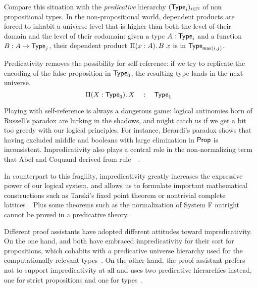 Compare this situation with the \emph{predicative} hierarchy 
$(\varType_i)_{i \in \Nat}$ 
% 
% 
of non propositional types.
In the non-propositional world, dependent products are forced to inhabit a 
universe level that is higher than both the level of their domain and the level
of their codomain:
% 
given a type \( A : \varType_i \) and a function \( {\tm{B}{A \to \varType_j}} \), 
their dependent product \( \Depfun{A}{B\ x} \) is in 
\( \varType_{\mathsf{max}(i,j)} \).
 
Predicativity removes the possibility for self-reference: if we try to 
replicate the encoding of the false proposition in \( \varType_0 \), the
resulting type lands in the next universe.
\[
\Depfun[X]{\varType_0}{X} \quad : \quad \varType_1
\]

Playing with self-reference is always a dangerous game: 
logical antinomies born of Russell's paradox are lurking in the shadows, and 
might catch us if we get a bit too greedy with our logical principles. 
% 
For instance, Berardi's paradox shows that having excluded middle and booleans
with large elimination in \( \varProp \) is inconsistent.
% 
Impredicativity also plays a central role in the non-normalizing term
that Abel and Coquand derived from rule~~.

In counterpart to this fragility, impredicativity greatly increases the
expressive power of our logical system, and allows us to formulate important 
mathematical constructions such as Tarski's fixed point theorem or nontrivial 
complete lattices~.
% 
Plus some theorems such as the normalization of System F outright cannot be 
proved in a predicative theory.

Different proof assistants have adopted different attitudes toward 
impredicativity.
% 
On the one hand,
% 
% 
\Coq and \Lean both have embraced impredicativity for their sort for propositions, 
which cohabits with a predicative universe hierarchy used for the computationally 
relevant types~.
%
On the other hand, the \Agda proof assistant prefers not to support impredicativity 
at all and uses two predicative hierarchies instead, 
one for strict propositions and one for types~.

